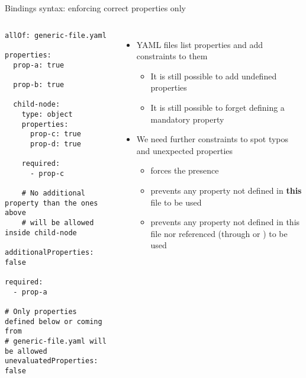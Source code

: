\begin{frame}[fragile]{Bindings syntax: enforcing correct properties only}
  \begin{columns}
    \begin{block}{}
      {\fontsize{5}{6}\selectfont
\begin{verbatim}
allOf: generic-file.yaml

properties:
  prop-a: true

  prop-b: true

  child-node:
    type: object
    properties:
      prop-c: true
      prop-d: true

    required:
      - prop-c

    # No additional property than the ones above
    # will be allowed inside child-node
    additionalProperties: false

required:
  - prop-a

# Only properties defined below or coming from
# generic-file.yaml will be allowed
unevaluatedProperties: false
\end{verbatim}
      }
    \end{block}
    \begin{itemize}
    \item YAML files list properties and add constraints to them
      \begin{itemize}
      \item It is still possible to add undefined properties
      \item It is still possible to forget defining a mandatory
        property
      \end{itemize}
    \item We need further constraints to spot typos and unexpected
      properties
      \begin{itemize}
      \item {} forces the presence
      \item {} prevents any property not
        defined in {\bf this} file to be used
      \item {} prevents any property not
        defined in this file nor referenced (through
         or {}) to be
        used
      \end{itemize}
    \end{itemize}
  \end{columns}
\end{frame}

